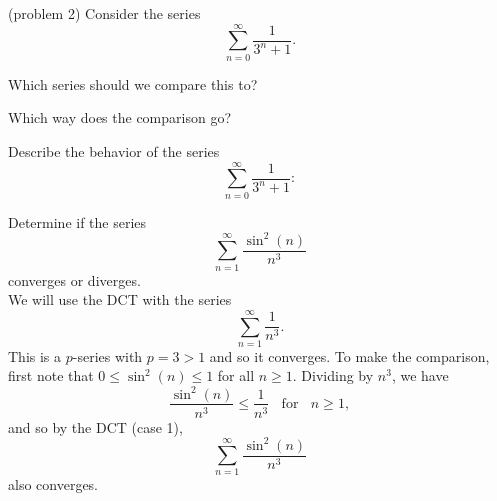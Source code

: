 \documentclass[handout]{ximera}
\begin{document}
\begin{problem}(problem 2)
Consider the series 
\[
\sum_{n=0}^\infty \frac{1}{3^n + 1}.
\]

Which series should we compare this to?

\begin{multipleChoice}
\end{multipleChoice}

Which way does the comparison go?
\begin{multipleChoice}
\end{multipleChoice}

Describe the behavior of the series 
\[
\sum_{n=0}^\infty \frac{1}{3^n + 1}:
\]

\begin{multipleChoice}
\end{multipleChoice}

\end{problem}



\begin{example}[example 3] %
Determine if the series 
\[
\sum_{n=1}^\infty \frac{\sin^2(n)}{n^3}
\]
 converges or diverges.\\
We will use the DCT with the series 
\[
\sum_{n=1}^\infty \frac{1}{n^3}.
\]
This is a $p$-series with $p=3 >1$ and so it converges.
To make the comparison, first note that $0 \leq \sin^2(n) \leq 1$ for all $n \geq 1$. Dividing by $n^3$,
we have 
\[
\frac{\sin^2(n)}{n^3} \leq \frac{1}{n^3} \; \; \text{ for } \; \; n \geq 1,
\]
and so by the DCT (case 1), 
\[
\sum_{n=1}^\infty \frac{\sin^2(n)}{n^3}
\]
 also converges.
\end{example}
\end{document}
